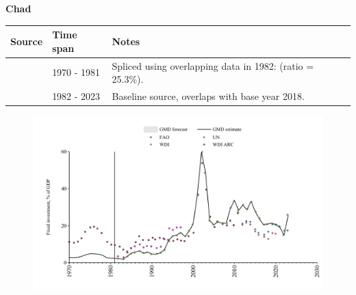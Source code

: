\documentclass[12pt,a4paper,landscape]{article}
\begin{document}
\begin{adjustbox}{max totalsize={\paperwidth}{\paperheight},center}
\begin{minipage}[t][\textheight][t]{\textwidth}
\vspace*{0.5cm}
{}
\begin{center}
{\Large\bfseries Chad}
\end{center}
\vspace{0.5cm}
\begin{table}[H]
\centering
\small
\begin{tabular}{|l|l|l|}
\hline
\textbf{Source} & \textbf{Time span} & \textbf{Notes} \\
\hline
\rowcolor{white}\cite{UN}& 1970 - 1981 &Spliced using overlapping data in 1982: (ratio = 25.3\%).\\
\rowcolor{lightgray}\cite{WDI}& 1982 - 2023 &Baseline source, overlaps with base year 2018.\\
\hline
\end{tabular}
\end{table}
\begin{figure}[H]
\centering
\includegraphics[width=\textwidth,height=0.6\textheight,keepaspectratio]{graphs/TCD_finv_GDP.pdf}
\end{figure}
\end{minipage}
\end{adjustbox}
\end{document}
